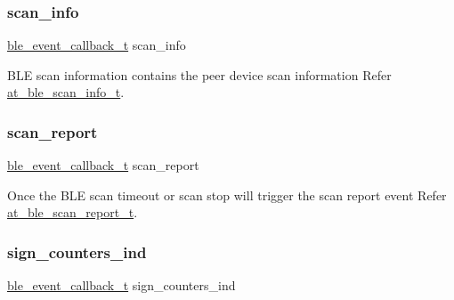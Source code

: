 \mbox{\label{structble__gap__event__cb_a329baf6bb5a032ec1cbc23129c8fdc34}} 
\subsubsection{\texorpdfstring{scan\_info}{scan\_info}}
{\footnotesize\ttfamily \mbox{\hyperlink{ble__manager_8h_a04ce4bb8cb8282f2762e3924b1773cc9}{ble\+\_\+event\+\_\+callback\+\_\+t}} scan\+\_\+info}



B\+LE scan information contains the peer device scan information Refer \mbox{\hyperlink{structat__ble__scan__info__t}{at\+\_\+ble\+\_\+scan\+\_\+info\+\_\+t}}. 

\mbox{\label{structble__gap__event__cb_a3ee0fc48015b52eadf114dc0230dfe24}} 
\subsubsection{\texorpdfstring{scan\_report}{scan\_report}}
{\footnotesize\ttfamily \mbox{\hyperlink{ble__manager_8h_a04ce4bb8cb8282f2762e3924b1773cc9}{ble\+\_\+event\+\_\+callback\+\_\+t}} scan\+\_\+report}



Once the B\+LE scan timeout or scan stop will trigger the scan report event Refer \mbox{\hyperlink{structat__ble__scan__report__t}{at\+\_\+ble\+\_\+scan\+\_\+report\+\_\+t}}. 

\mbox{\label{structble__gap__event__cb_a3acdd775f490630b4df601a35256aefa}} 
\subsubsection{\texorpdfstring{sign\_counters\_ind}{sign\_counters\_ind}}
{\footnotesize\ttfamily \mbox{\hyperlink{ble__manager_8h_a04ce4bb8cb8282f2762e3924b1773cc9}{ble\+\_\+event\+\_\+callback\+\_\+t}} sign\+\_\+counters\+\_\+ind}



